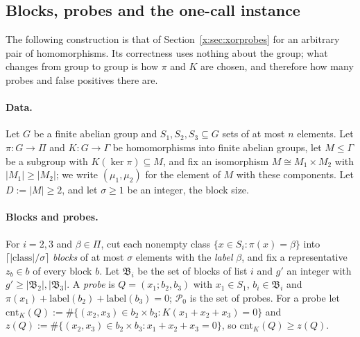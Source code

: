 \documentclass[11pt]{article}
\theoremstyle{definition}
\theoremstyle{remark}
\newcommand{\cnt}{\mathrm{cnt}}
\newcommand{\Pq}{\mathcal{P}}
\begin{document}
\subsection{Blocks, probes and the one-call instance}\label{g:sec:instance}

The following construction is that of Section~\ref{x:sec:xorprobes} for an arbitrary pair of homomorphisms. Its correctness uses nothing about the group; what changes from group to group is how $\pi$ and $K$ are chosen, and therefore how many probes and false positives there are.

\paragraph{Data.} Let $G$ be a finite abelian group and $S_1,S_2,S_3\subseteq G$ sets of at most $n$ elements. Let $\pi\colon G\to\Pi$ and $K\colon G\to\Gamma$ be homomorphisms into finite abelian groups, let $M\le\Gamma$ be a subgroup with $K(\ker\pi)\subseteq M$, and fix an isomorphism $M\cong M_1\times M_2$ with $|M_1|\ge|M_2|$; we write $(\mu_1,\mu_2)$ for the element of $M$ with these components. Let $D:=|M|\ge2$, and let $\sigma\ge1$ be an integer, the block size.

\paragraph{Blocks and probes.} For $i=2,3$ and $\beta\in\Pi$, cut each nonempty class $\{x\in S_i:\pi(x)=\beta\}$ into $\lceil|\text{class}|/\sigma\rceil$ \emph{blocks} of at most $\sigma$ elements with the \emph{label} $\beta$, and fix a representative $z_b\in b$ of every block $b$. Let $\mathfrak B_i$ be the set of blocks of list $i$ and $g'$ an integer with $g'\ge|\mathfrak B_2|,|\mathfrak B_3|$. A \emph{probe} is $Q=(x_1;b_2,b_3)$ with $x_1\in S_1$, $b_i\in\mathfrak B_i$ and $\pi(x_1)+\mathrm{label}(b_2)+\mathrm{label}(b_3)=0$; $\Pq_0$ is the set of probes. For a probe let $\cnt_K(Q):=\#\{(x_2,x_3)\in b_2\times b_3:K(x_1+x_2+x_3)=0\}$ and $z(Q):=\#\{(x_2,x_3)\in b_2\times b_3:x_1+x_2+x_3=0\}$, so $\cnt_K(Q)\ge z(Q)$.
\end{document}
